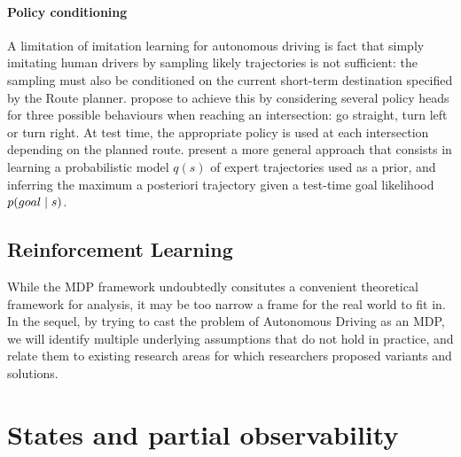 \paragraph{Policy conditioning} A limitation of imitation learning for autonomous driving is fact that simply imitating human drivers by sampling likely trajectories is not sufficient: the sampling must also be conditioned on the current short-term destination specified by the Route planner. \citep{Codevilla2018} propose to achieve this by considering several policy heads for three possible behaviours when reaching an intersection: go straight, turn left or turn right. At test time, the appropriate policy is used at each intersection depending on the planned route. \citep{Rhinehart2020} present a more general approach that consists in learning a probabilistic model $q(s)$ of expert trajectories used as a prior, and inferring the maximum a posteriori trajectory given a test-time goal likelihood $p\lparen goal\mid s\rparen$.

\subsection{Reinforcement Learning}

While the MDP framework undoubtedly consitutes a convenient theoretical framework for analysis, it may be too narrow a frame for the real world to fit in. In the sequel, by trying to cast the problem of Autonomous Driving as an MDP, we will identify multiple underlying assumptions that do not hold in practice, and relate them to existing research areas for which researchers proposed variants and solutions.

\section{States and partial observability}

